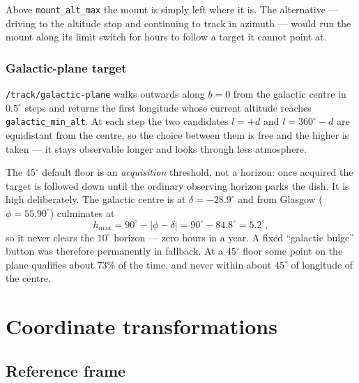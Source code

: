 \documentclass[11pt,a4paper]{article}
\begin{document}
Above \texttt{mount\_alt\_max} the mount is simply left where it is. The alternative --- driving to the altitude stop and continuing to track in azimuth --- would run the mount along its limit switch for hours to follow a target it cannot point at.

\subsubsection{Galactic-plane target}
\label{sec:galplane}

\texttt{/track/galactic-plane} walks outwards along $b=0$ from the galactic centre in $0.5^\circ$ steps and returns the first longitude whose current altitude reaches \texttt{galactic\_min\_alt}. At each step the two candidates $l = +d$ and $l = 360^\circ - d$ are equidistant from the centre, so the choice between them is free and the higher is taken --- it stays observable longer and looks through less atmosphere.

The $45^\circ$ default floor is an \emph{acquisition} threshold, not a horizon: once acquired the target is followed down until the ordinary observing horizon parks the dish. It is high deliberately. The galactic centre is at $\delta = -28.9^\circ$ and from Glasgow ($\phi = 55.90^\circ$) culminates at
\begin{equation}
h_\text{max} = 90^\circ - |\phi - \delta| = 90^\circ - 84.8^\circ = 5.2^\circ,
\end{equation}
so it never clears the $10^\circ$ horizon --- zero hours in a year. A fixed ``galactic bulge'' button was therefore permanently in fallback. At a $45^\circ$ floor some point on the plane qualifies about 73\% of the time, and never within about $45^\circ$ of longitude of the centre.

\section{Coordinate transformations}
\label{sec:coordinates}

\subsection{Reference frame}
\end{document}
